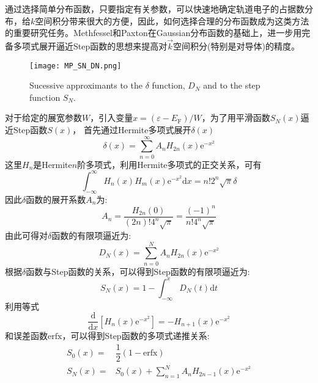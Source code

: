 通过选择简单分布函数，只要指定有关参数，可以快速地确定轨道电子的占据数分布，给$k$空间积分带来很大的方便，因此，如何选择合理的分布函数成为这类方法的重要研究任务。\textrm{Methfessel}和\textrm{Paxton}\cite{PRB40-3616_1989}在\textrm{Gaussian}分布函数的基础上，进一步用完备多项式展开逼近\textrm{Step}函数的思想来提高对$\vec k$空间积分(特别是对导体)的精度。
\begin{figure}[t]
	\centering
	\vspace*{-0.5in}
	\texttt{[image: MP\_SN\_DN.png]}
	\caption{\textrm{Sucessive approximants to the $\delta$ function, $D_N$ and to the step function $S_N$.}}%
	\label{MP_SN_DN}
\end{figure}
对于给定的展宽参数$W$，引入变量$x=(\varepsilon-E_{\mathrm F})/W$，为了用平滑函数$S_N(x)$逼近\textrm{Step}函数$S(x)$，%
首先通过\textrm{Hermite}多项式展开$\delta(x)$
\begin{equation}
	\delta(x)=\sum_{n=0}^{\infty}A_nH_{2n}(x)\mathrm{e}^{-x^2}
	\label{eq:solid_kpoint-Gaussian-delta}
\end{equation}
这里$H_n$是\textrm{Hermite}$n$阶多项式，利用\textrm{Hermite}多项式的正交关系，可有
\begin{displaymath}
	\int_{-\infty}^{\infty}H_n(x)H_m(x)\mathrm{e}^{-x^2}\mathrm{d}x=n!2^n\sqrt{\pi}\delta
\end{displaymath}
因此$\delta$函数的展开系数$A_n$为:~
\begin{equation}
	A_n=\frac{H_{2n}(0)}{(2n)!4^n\sqrt{\pi}}=\frac{(-1)^n}{n!4^n\sqrt{\pi}}
	\label{eq:solid_kpoint-Gaussian-d-coeff}
\end{equation}
由此可得对$\delta$函数的有限项逼近为:~
\begin{displaymath}
	D_N(x)=\sum_{n=0}^NA_nH_{2n}(x)\mathrm{e}^{-x^2}
\end{displaymath}
根据$\delta$函数与\textrm{Step}函数的关系，可以得到\textrm{Step}函数的有限项逼近为:~
\begin{equation}
	S_N(x)=1-\int_{-\infty}^xD_N(t)\mathrm{d}t
	\label{eq:solid_kpoint-Gaussian-step}
\end{equation}
利用等式
\begin{displaymath}
	\dfrac{\mathrm{d}}{\mathrm{d}x}[H_n(x)\mathrm{e}^{-x^2}]=-H_{n+1}(x)\mathrm{e}^{-x^2}
\end{displaymath}
和误差函数$\mathrm{erfx}$，可以得到\textrm{Step}函数的多项式递推关系:
\begin{equation}
	\begin{aligned}
		S_0(x)=&\dfrac12(1-\mathrm{erfx})\\
		S_N(x)=&S_0(x)+\sum_{n=1}^NA_nH_{2n-1}(x)\mathrm{e}^{-x^2}
	\end{aligned}
	\label{eq:solid_kpoint-Gaussian-step2}
\end{equation}

